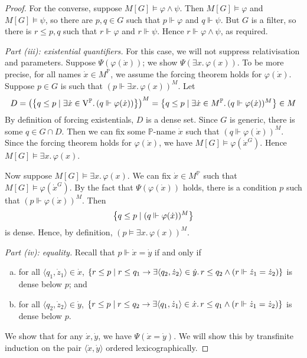 \begin{proof}
    For the converse, suppose \( M[G] \vDash \varphi \wedge \psi \).
    Then \( M[G] \vDash \varphi \) and \( M[G] \vDash \psi \), so there are \( p, q \in G \) such that \( p \Vdash \varphi \) and \( q \Vdash \psi \).
    But \( G \) is a filter, so there is \( r \leq p, q \) such that \( r \Vdash \varphi \) and \( r \Vdash \psi \).
    Hence \( r \Vdash \varphi \wedge \psi \), as required.

    \emph{Part (iii): existential quantifiers.}
    For this case, we will not suppress relativisation and parameters.
    Suppose \( \Psi(\varphi(\dot x)) \); we show \( \Psi(\exists x.\, \varphi(x)) \).
    To be more precise, for all names \( \dot x \in M^{\mathbb P} \), we assume the forcing theorem holds for \( \varphi(\dot x) \).
    Suppose \( p \in G \) is such that \( (p \Vdash \exists x.\, \varphi(x))^M \).
    Let
    \[ D = \qty(\qty{q \leq p \mid \exists \dot x \in \mathrm{V}^{\mathbb P}.\, (q \Vdash \varphi(\dot x))})^M = \qty{q \leq p \mid \exists \dot x \in M^{\mathbb P}.\, (q \Vdash \varphi(\dot x))^M} \in M \]
    By definition of forcing existentials, \( D \) is a dense set.
    Since \( G \) is generic, there is some \( q \in G \cap D \).
    Then we can fix some \( \mathbb P \)-name \( \dot x \) such that \( (q \Vdash \varphi(\dot x))^M \).
    Since the forcing theorem holds for \( \varphi(\dot x) \), we have \( M[G] \vDash \varphi(\dot x^G) \).
    Hence \( M[G] \vDash \exists x.\, \varphi(x) \).

    Now suppose \( M[G] \vDash \exists x.\, \varphi(x) \).
    We can fix \( \dot x \in M^{\mathbb P} \) such that \( M[G] \vDash \varphi(\dot x^G) \).
    By the fact that \( \Psi(\varphi(\dot x)) \) holds, there is a condition \( p \) such that \( (p \Vdash \varphi(\dot x))^M \).
    Then
    \[ \qty{q \leq p \mid (q \Vdash \varphi(\dot x))^M} \]
    is dense.
    Hence, by definition, \( (p \vDash \exists x.\, \varphi(x))^M \).

    \emph{Part (iv): equality.}
    Recall that \( p \Vdash \dot x = \dot y \) if and only if
    \begin{enumerate}[(a)]
        \item for all \( \langle q_1, \dot z_1 \rangle \in \dot x \), \( \qty{r \leq p \mid r \leq q_1 \to \exists \langle q_2, \dot z_2 \rangle \in \dot y.\, r \leq q_2 \wedge (r \Vdash \dot z_1 = \dot z_2)} \) is dense below \( p \); and
        \item for all \( \langle q_2, \dot z_2 \rangle \in \dot y \), \( \qty{r \leq p \mid r \leq q_2 \to \exists \langle q_1, \dot z_1 \rangle \in \dot x.\, r \leq q_1 \wedge (r \Vdash \dot z_1 = \dot z_2)} \) is dense below \( p \).
    \end{enumerate}
    We show that for any \( \dot x, \dot y \), we have \( \Psi(\dot x = \dot y) \).
    We will show this by transfinite induction on the pair \( \langle \dot x, \dot y \rangle \) ordered lexicographically.


\end{proof}

